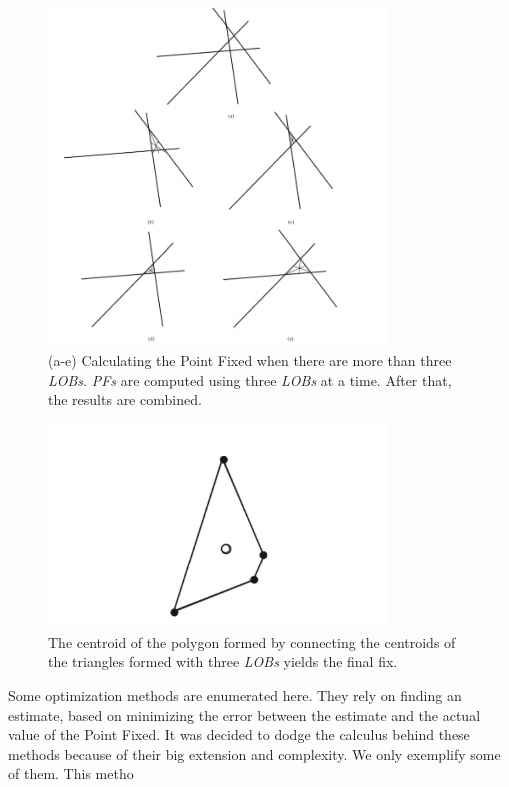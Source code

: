 \documentclass[english,purist]{ist-report}
\begin{document}
\begin{figure}[ht]
\centering
\includegraphics[width=90mm]{target8.png}
\caption{(a-e) Calculating the Point Fixed when there are more than three \textit{LOBs}. \textit{PFs} are computed using three \textit{LOBs} at a time. After that, the results are combined.}
\label{target8}
\end{figure} 



\begin{figure}[ht]
\centering
\includegraphics[width=90mm]{target9.png}
\caption{The centroid of the polygon formed by connecting the centroids of the triangles formed with three \textit{LOBs} yields the final fix.}
\label{target9}
\end{figure} 

Some optimization methods are enumerated here. They rely on finding an estimate, based on minimizing the error between the estimate and the actual value of the Point Fixed. It was decided to dodge the calculus behind these methods because of their big extension and complexity. We only exemplify some of them. This metho
\end{document}
